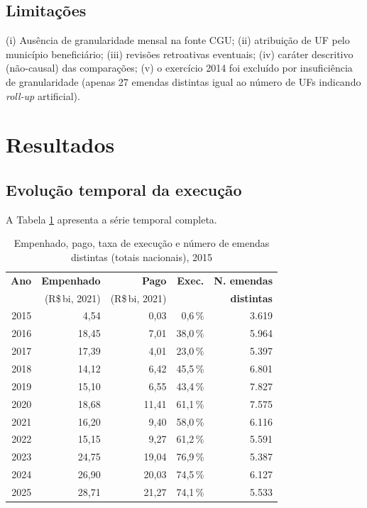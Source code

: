 \documentclass[12pt,a4paper,oneside]{article}
\newcommand{\rs}{R\$\,}
\begin{document}
\subsection{Limitações}\label{sec:limit}

(i) Ausência de granularidade mensal na fonte CGU; (ii) atribuição
de UF pelo município beneficiário; (iii) revisões retroativas
eventuais; (iv) caráter descritivo (não-causal) das comparações;
(v) o exercício 2014 foi excluído por insuficiência de granularidade
(apenas 27 emendas distintas \textemdash{} igual ao número de UFs
\textemdash{} indicando \textit{roll-up} artificial).

\section{Resultados}\label{sec:resultados}

\subsection{Evolução temporal da execução}

A Tabela \ref{tab:evolucao} apresenta a série temporal completa.

\begin{table}[H]
\centering
\caption{Empenhado, pago, taxa de execução e número de emendas distintas (totais nacionais), 2015}
\begin{tabular}{rrrrr}
\toprule
\textbf{Ano} & \textbf{Empenhado} & \textbf{Pago} & \textbf{Exec.} & \textbf{N. emendas} \\
             & (\rs bi, 2021)    & (\rs bi, 2021) &              & \textbf{distintas} \\
\midrule
2015 &  4,54 &  0,03 &  0,6\,\% &  3.619 \\
2016 & 18,45 &  7,01 & 38,0\,\% &  5.964 \\
2017 & 17,39 &  4,01 & 23,0\,\% &  5.397 \\
2018 & 14,12 &  6,42 & 45,5\,\% &  6.801 \\
2019 & 15,10 &  6,55 & 43,4\,\% &  7.827 \\
2020 & 18,68 & 11,41 & 61,1\,\% &  7.575 \\
2021 & 16,20 &  9,40 & 58,0\,\% &  6.116 \\
2022 & 15,15 &  9,27 & 61,2\,\% &  5.591 \\
2023 & 24,75 & 19,04 & 76,9\,\% &  5.387 \\
2024 & 26,90 & 20,03 & 74,5\,\% &  6.127 \\
2025 & 28,71 & 21,27 & 74,1\,\% &  5.533 \\
\bottomrule
\end{tabular}
\par{}
\label{tab:evolucao}
\end{table}
\end{document}
